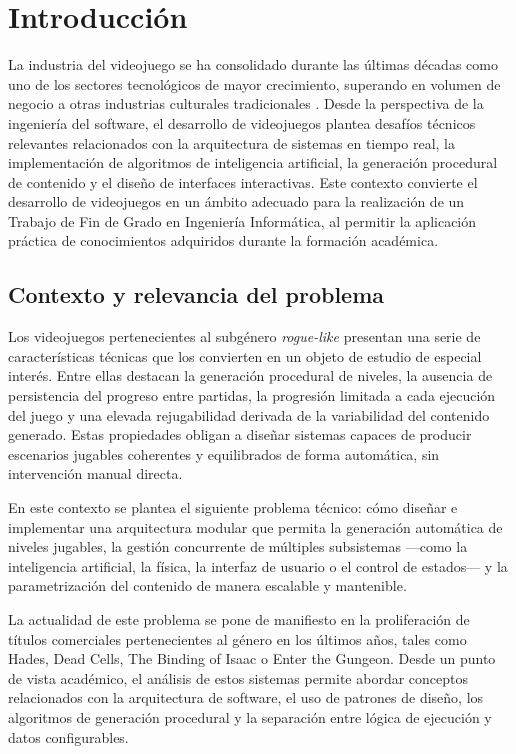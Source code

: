 \chapter{Introducción}

La industria del videojuego se ha consolidado durante las últimas décadas como uno de los sectores tecnológicos de mayor crecimiento, superando en volumen de negocio a otras industrias culturales tradicionales \cite{GAMES_REPORT}. Desde la perspectiva de la ingeniería del software, el desarrollo de videojuegos plantea desafíos técnicos relevantes relacionados con la arquitectura de sistemas en tiempo real, la implementación de algoritmos de inteligencia artificial, la generación procedural de contenido y el diseño de interfaces interactivas. Este contexto convierte el desarrollo de videojuegos en un ámbito adecuado para la realización de un Trabajo de Fin de Grado en Ingeniería Informática, al permitir la aplicación práctica de conocimientos adquiridos durante la formación académica.

\section{Contexto y relevancia del problema}

Los videojuegos pertenecientes al subgénero \textit{rogue-like} presentan una serie de características técnicas que los convierten en un objeto de estudio de especial interés. Entre ellas destacan la generación procedural de niveles, la ausencia de persistencia del progreso entre partidas, la progresión limitada a cada ejecución del juego y una elevada rejugabilidad derivada de la variabilidad del contenido generado. Estas propiedades obligan a diseñar sistemas capaces de producir escenarios jugables coherentes y equilibrados de forma automática, sin intervención manual directa.

En este contexto se plantea el siguiente problema técnico: cómo diseñar e implementar una arquitectura modular que permita la generación automática de niveles jugables, la gestión concurrente de múltiples subsistemas —como la inteligencia artificial, la física, la interfaz de usuario o el control de estados— y la parametrización del contenido de manera escalable y mantenible.

La actualidad de este problema se pone de manifiesto en la proliferación de títulos comerciales pertenecientes al género en los últimos años, tales como Hades, Dead Cells, The Binding of Isaac o Enter the Gungeon. Desde un punto de vista académico, el análisis de estos sistemas permite abordar conceptos relacionados con la arquitectura de software, el uso de patrones de diseño, los algoritmos de generación procedural y la separación entre lógica de ejecución y datos configurables.

